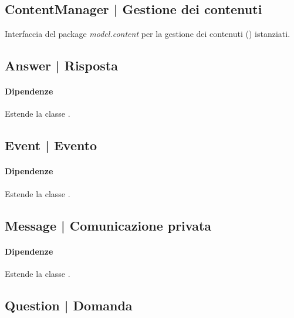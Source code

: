 \documentclass[10pt,a4paper,headinclude,footinclude,hidelinks]{scrreprt} %
\begin{document}
	\subsection[ContentManager]{ContentManager | Gestione dei contenuti}
	\label{sec:stage:design:sistema:model.content:content-manager}
	Interfaccia del package \textit{model.content} per la gestione dei contenuti (\textit{}) istanziati.

	\subsection[Answer]{Answer | Risposta}
	\label{sec:stage:design:sistema:model.content:answer}

	\paragraph{Dipendenze} Estende la classe \textit{}.

	\subsection[Event]{Event | Evento}
	\label{sec:stage:design:sistema:model.content:event}

	\paragraph{Dipendenze} Estende la classe \textit{}.

	\subsection[Message]{Message | Comunicazione privata}
	\label{sec:stage:design:sistema:model.content:message}

	\paragraph{Dipendenze} Estende la classe \textit{}.

	\subsection[Question]{Question | Domanda}
	\label{sec:stage:design:sistema:model.content:question}
\end{document}
